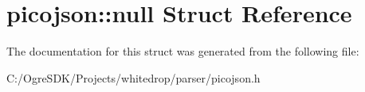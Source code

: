 \hypertarget{structpicojson_1_1null}{\section{picojson\+:\+:null Struct Reference}
\label{structpicojson_1_1null}
}


The documentation for this struct was generated from the following file\+:\begin{DoxyCompactItemize}
\item 
C\+:/\+Ogre\+S\+D\+K/\+Projects/whitedrop/parser/picojson.\+h\end{DoxyCompactItemize}
